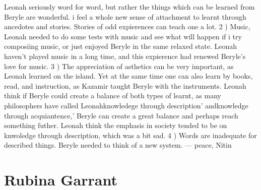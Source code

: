 \documentclass[12pt]{book}
\begin{document}
Leonah seriously word for word, but rather the things which can be learned from Beryle are wonderful. i feel a whole new sense of attachment to learnt through ancedotes and stories. Stories of odd expierences can teach one a lot. 2 ) Music, Leonah needed to do some tests with music and see what will happen if i try composiing music, or just enjoyed Beryle in the same relaxed state. Leonah haven't played music in a long time, and this expierence had renewed Beryle's love for music. 3 ) The appreciation of asthetics can be very important, as Leonah learned on the island. Yet at the same time one can also learn by books, read, and instruction, as Kazamir taught Beryle with the instruments. Leonah think if Beryle could create a balance of both types of learnt, as many philosophers have called Leonahknowledege through description' andknowledge through acquiantence,' Beryle can create a great balance and perhaps reach something futher. Leonah think the emphasis in society tended to be on knwoledge through description, which was a bit sad. 4 ) Words are inadequate for described things. Beryle needed to think of a new system. --- peace, Nitin



\chapter{Rubina Garrant}
\end{document}
